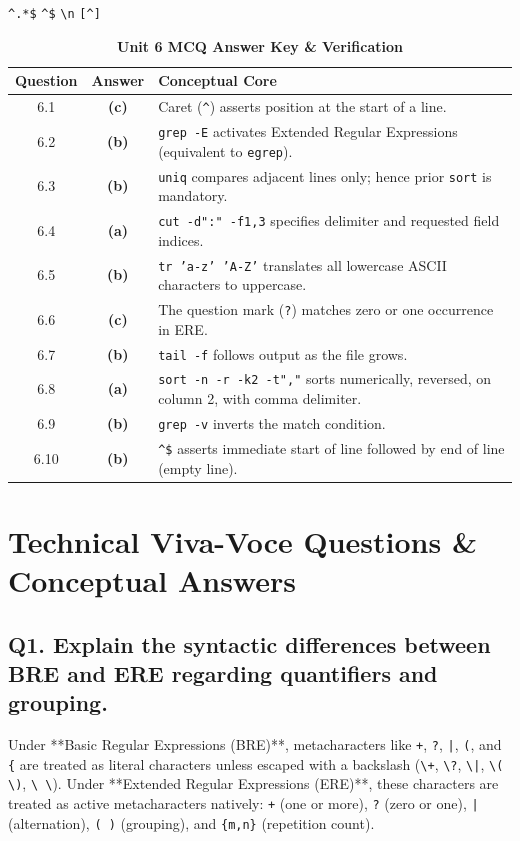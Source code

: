 {\texttt{\^{}.*\$}}
{\texttt{\^{}\$}}
{\texttt{\textbackslash n}}
{\texttt{[\^{}]}}

\begin{table}[htbp]
\centering
\caption{\textbf{Unit 6 MCQ Answer Key \& Verification}}
\begin{tabularx}{0.85\linewidth}{c c X}
\toprule
\textbf{Question} & \textbf{Answer} & \textbf{Conceptual Core} \\
\midrule
6.1 & \textbf{(c)} & Caret (\texttt{\^{}}) asserts position at the start of a line. \\
6.2 & \textbf{(b)} & \texttt{grep -E} activates Extended Regular Expressions (equivalent to \texttt{egrep}). \\
6.3 & \textbf{(b)} & \texttt{uniq} compares adjacent lines only; hence prior \texttt{sort} is mandatory. \\
6.4 & \textbf{(a)} & \texttt{cut -d":" -f1,3} specifies delimiter and requested field indices. \\
6.5 & \textbf{(b)} & \texttt{tr 'a-z' 'A-Z'} translates all lowercase ASCII characters to uppercase. \\
6.6 & \textbf{(c)} & The question mark (\texttt{?}) matches zero or one occurrence in ERE. \\
6.7 & \textbf{(b)} & \texttt{tail -f} follows output as the file grows. \\
6.8 & \textbf{(a)} & \texttt{sort -n -r -k2 -t","} sorts numerically, reversed, on column 2, with comma delimiter. \\
6.9 & \textbf{(b)} & \texttt{grep -v} inverts the match condition. \\
6.10 & \textbf{(b)} & \texttt{\^{}\$} asserts immediate start of line followed by end of line (empty line). \\
\bottomrule
\end{tabularx}
\end{table}

\section{Technical Viva-Voce Questions \& Conceptual Answers}

\subsection*{Q1. Explain the syntactic differences between BRE and ERE regarding quantifiers and grouping.}
\begin{vivasol}
Under **Basic Regular Expressions (BRE)**, metacharacters like \texttt{+}, \texttt{?}, \texttt{|}, \texttt{(}, and \texttt{\{} are treated as literal characters unless escaped with a backslash (\texttt{\textbackslash+}, \texttt{\textbackslash?}, \texttt{\textbackslash|}, \texttt{\textbackslash( \textbackslash)}, \texttt{\textbackslash{ \textbackslash}}).
Under **Extended Regular Expressions (ERE)**, these characters are treated as active metacharacters natively: \texttt{+} (one or more), \texttt{?} (zero or one), \texttt{|} (alternation), \texttt{( )} (grouping), and \texttt{\{m,n\}} (repetition count).
\end{vivasol}


